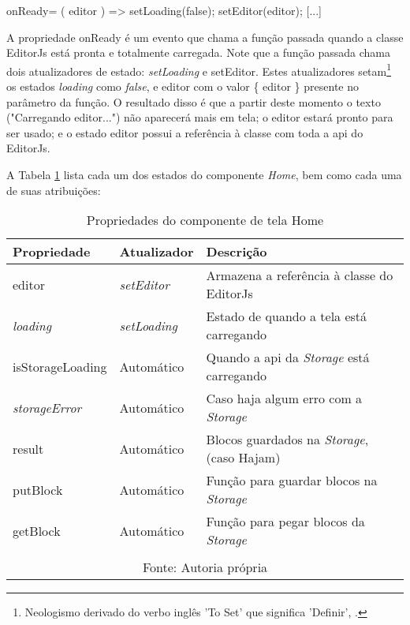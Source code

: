 \begin{Code068b9fab1d514746b6ae7c975620b1fe}
[...]
onReady={ ({ editor }) => {
    setLoading(false);
    setEditor(editor);
} }
[...]
\end{Code068b9fab1d514746b6ae7c975620b1fe}

A propriedade onReady é um evento que chama
a função passada quando a classe EditorJs está pronta e
totalmente carregada. Note que a função passada chama dois
atualizadores de estado: \textit{setLoading} e setEditor. Estes atualizadores
setam\footnote{Neologismo derivado do verbo inglês 'To Set' que significa 'Definir',
    \cite{setar}.
}
os estados \textit{loading} como \textit{false}, e editor com o valor \{ editor \} presente
no parâmetro da função. O resultado disso é que a partir deste momento
o texto ("Carregando editor...") não aparecerá mais em tela; o editor
estará pronto para ser usado; e o estado editor possui a referência
à classe com toda a
\acrshort{api}
do EditorJs.

A
            Tabela \ref{tbl:props-componente-home}
            lista cada um dos estados do componente \textit{Home}, bem como cada uma de suas
            atribuições:

\begin{table}[H]
    \centering
    \caption{Propriedades do componente de tela Home}
    \label{tbl:props-componente-home}
    \renewcommand{\arraystretch}{1.5}
    \begin{tabular}{p{3.5200cm} p{2.8800cm} p{9.6000cm}}
        \hline
        \textbf{Propriedade} & \textbf{Atualizador} & \textbf{Descrição} \\
        \hline
        editor & \textit{setEditor} & Armazena a referência à classe do EditorJs \\
		\textit{loading} & \textit{setLoading} & Estado de quando a tela está carregando \\
		isStorageLoading & Automático & Quando a \acrshort{api}                    da \textit{Storage} está carregando \\
		\textit{storageError} & Automático & Caso haja algum erro com a \textit{Storage} \\
		result & Automático & Blocos guardados na \textit{Storage}, (caso Hajam) \\
		putBlock & Automático & Função para guardar blocos na \textit{Storage} \\
		getBlock & Automático & Função para pegar blocos da \textit{Storage} \\
        \hline
        \\\multicolumn{3}{c}{\fontsize{10pt}{12pt}Fonte: Autoria própria}
    \end{tabular}
\end{table}

